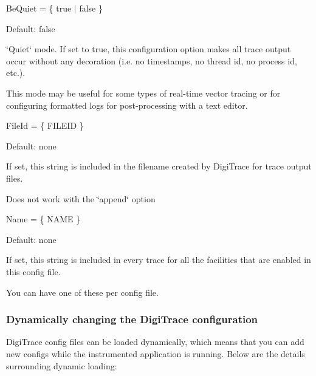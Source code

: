 \begin{DoxyItemize}
\begin{DoxyItemize}
\end{DoxyItemize}
\item {\ttfamily Be\+Quiet = \{ true $\vert$ false \} } 
\begin{DoxyItemize}
\item Default\+: {\ttfamily false}  
\item \char`\"{}\+Quiet\char`\"{} mode. If set to {\ttfamily true}, this configuration option makes all trace output occur without any decoration (i.\+e. no timestamps, no thread id, no process id, etc.).  
\item This mode may be useful for some types of real-\/time vector tracing or for configuring formatted logs for post-\/processing with a text editor.  
\end{DoxyItemize}
\item {\ttfamily File\+Id = \{ F\+I\+L\+E\+I\+D \} } 
\begin{DoxyItemize}
\item Default\+: none  
\item If set, this string is included in the filename created by Digi\+Trace for trace output files.  
\item Does not work with the \char`\"{}append\char`\"{} option  
\end{DoxyItemize}
\item {\ttfamily Name = \{ N\+A\+M\+E \} } 
\begin{DoxyItemize}
\item Default\+: none  
\item If set, this string is included in every trace for all the facilities that are enabled in this config file.  
\item You can have one of these per config file.  
\end{DoxyItemize}
\end{DoxyItemize}

\hypertarget{a00364_digitrace__advancedconfiguration__dynamicreconfiguation}{}\subsubsection{Dynamically changing the Digi\+Trace configuration}\label{a00364_digitrace__advancedconfiguration__dynamicreconfiguation}
 Digi\+Trace config files can be loaded dynamically, which means that you can add new configs while the instrumented application is running. Below are the details surrounding dynamic loading\+:

